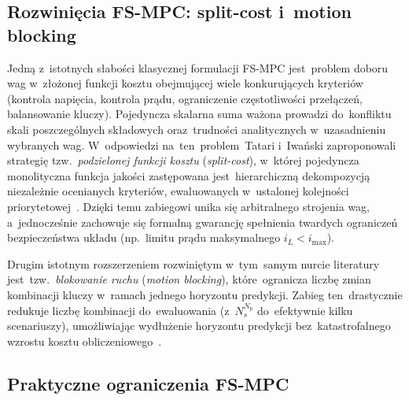 \subsection*{Rozwinięcia FS-MPC: split-cost i~motion blocking}

Jedną z~istotnych słabości klasycznej formulacji FS-MPC jest~problem doboru wag w~złożonej funkcji kosztu obejmującej wiele konkurujących kryteriów (kontrola napięcia, kontrola prądu, ograniczenie częstotliwości przełączeń, balansowanie kluczy). Pojedyncza skalarna suma ważona prowadzi do~konfliktu skali poszczególnych składowych oraz~trudności analitycznych w~uzasadnieniu wybranych wag. W~odpowiedzi na~ten~problem~Tatari i~Iwański zaproponowali strategię tzw.~\emph{podzielonej funkcji kosztu} (\emph{split-cost}), w~której pojedyncza monolityczna funkcja jakości zastępowana jest~hierarchiczną dekompozycją niezależnie ocenianych kryteriów, ewaluowanych w~ustalonej kolejności priorytetowej~\cite{tatari2025splitcost}. Dzięki temu zabiegowi unika się arbitralnego strojenia wag, a~jednocześnie zachowuje się formalną gwarancję spełnienia twardych ograniczeń bezpieczeństwa układu (np.~limitu prądu maksymalnego $i_L < i_{\max}$).

Drugim istotnym rozszerzeniem rozwiniętym w~tym~samym nurcie literatury jest~tzw.~\emph{blokowanie ruchu} (\emph{motion blocking}), które~ogranicza liczbę zmian kombinacji kluczy w~ramach jednego horyzontu predykcji. Zabieg ten~drastycznie redukuje liczbę kombinacji do~ewaluowania (z~$N_s^{N_p}$ do~efektywnie kilku scenariuszy), umożliwiając wydłużenie horyzontu predykcji bez~katastrofalnego wzrostu kosztu obliczeniowego~\cite{tatari2025splitcost}.

\subsection*{Praktyczne ograniczenia FS-MPC}

